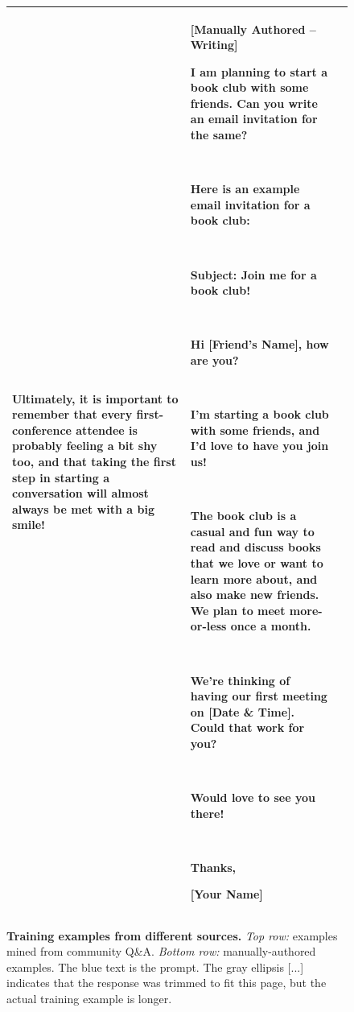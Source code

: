 \begin{figure}[p]
\begin{tabular}{@{}p{}p{}p{}@{}}
    Ultimately, it is important to remember that every first-conference attendee is probably feeling a bit shy too, and that taking the first step in starting a conversation will almost always be met with a big smile! 

    &
    \textbf{[Manually Authored -- Writing]}
    
    \textcolor[HTML]{3078BE}{\textbf{I am planning to start a book club with some friends. Can you write an email invitation for the same?}}

    ~
    
    Here is an example email invitation for a book club:

    ~

    Subject: Join me for a book club!

    ~
    
    Hi [Friend's Name], how are you?

    ~
    
    I'm starting a book club with some friends, and I'd love to have you join us!

    ~
    
    The book club is a casual and fun way to read and discuss books that we love or want to learn more about, and also make new friends. We plan to meet more-or-less once a month.

    ~
    
    We're thinking of having our first meeting on [Date \& Time]. Could that work for you?

    ~
    
    Would love to see you there!

    ~
    
    Thanks,
    
    [Your Name]
    \\
    \bottomrule
    \end{tabular}
    \caption{\textbf{Training examples from different sources.} \textit{Top row:} examples mined from community Q\&A. \textit{Bottom row:} manually-authored examples. The \textcolor[HTML]{3078BE}{blue} text is the prompt. The gray ellipsis \textcolor[HTML]{808080}{[...]} indicates that the response was trimmed to fit this page, but the actual training example is longer.}
    \label{fig:training_examples}
\end{figure}
